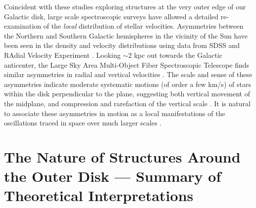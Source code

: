 \documentclass[galaxies,article,submit,moreauthors,pdftex,10pt,a4paper]{mdpi}
\begin{document}

Coincident with these studies exploring structures at the very outer edge of our Galactic disk,
large scale spectroscopic surveys have allowed a detailed re-examination of the {\it local} distribution of stellar velocities.
Asymmetries between the Northern and Southern Galactic hemispheres in the vicinity of the Sun have been seen in the density and velocity distributions using data from SDSS \cite{widrow12,yanny13} and RAdial Velocity Experiment \cite[RAVE, see][]{??,williams13}.
Looking $\sim$2 kpc out towards the Galactic anticenter, the Large Sky Area Multi-Object Fiber Spectroscopic Telescope \cite[LAMOST,][]{cui12,deng12,zhao12} finds similar asymmetries in radial and vertical velocities \cite{carlin13}.
The scale and sense of these asymmetries indicate moderate systematic motions (of order a few km/s)  of stars within the disk perpendicular to the plane,  suggesting both vertical movement of the midplane, and compression and rarefaction of the vertical scale \cite[referred to as ``bending'' and ``breathing'' modes respectively --- see,][]{widrow14}.
It is natural to associate these asymmetries in motion as a local manifestations of the oscillations traced in space over much larger scales \cite{xu15,pricewhelan15}.


\section{The Nature of Structures Around the Outer Disk --- Summary of Theoretical Interpretations}
\label{sec:theory}
\end{document}
